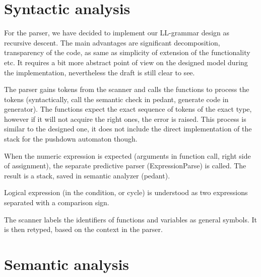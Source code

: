 \documentclass[12pt,a4paper,titlepage]{report}
\begin{document}
\section{Syntactic analysis}

\begin{justify}
For the parser, we have decided to implement our LL-grammar design as recursive descent.
The main advantages are significant decomposition, transparency of the code,
as same as simplicity of extension of the functionality etc.
It requires a bit more abstract point of view on the designed model during the
implementation, nevertheless the draft is still clear to see.
\end {justify}

\begin{justify}
The parser gains tokens from the scanner and calls the functions to process the
 tokens (syntactically, call the semantic check in pedant, generate code in
 generator). The functions expect the exact sequence of tokens of the exact
 type, however if it will not acquire the right ones, the error is raised.
 This process is similar to the designed one, it does not include the direct
 implementation of the stack for the pushdown automaton though.
\end{justify}

\begin{justify}
When the numeric expression is expected (arguments in function call,
right side of assignment), the separate predictive parser (ExpressionParse)
is called. The result is a stack, saved in semantic analyzer (pedant).
\end{justify}

\begin{justify}
Logical expression (in the condition, or cycle) is understood as two expressions
separated with a comparison sign.
\end{justify}

\begin{justify}
The scanner labels the identifiers of functions and variables as general symbols.
It is then retyped, based on the context in the parser.
\end{justify}

\section{Semantic analysis}
\end{document}
